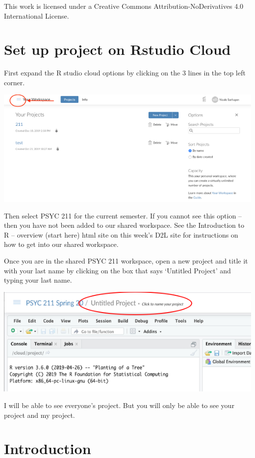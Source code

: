 \documentclass[
]{book}
\begin{document}
This work is licensed under a Creative Commons Attribution-NoDerivatives 4.0 International License.

\hypertarget{set-up-project-on-rstudio-cloud}{%
\chapter{Set up project on Rstudio Cloud}\label{set-up-project-on-rstudio-cloud}}

First expand the R studio cloud options by clicking on the 3 lines in the top left corner.

\includegraphics{img/Picture1.png}

Then select PSYC 211 for the current semester. If you cannot see this option -- then you have not been added to our shared workspace. See the Introduction to R -- overview (start here) html site on this week's D2L site for instructions on how to get into our shared workspace.

Once you are in the shared PSYC 211 workspace, open a new project and title it with your last name by clicking on the box that says `Untitled Project' and typing your last name.

\includegraphics{img/Projname.png}

I will be able to see everyone's project. But you will only be able to see your project and my project.

\hypertarget{introduction}{%
\chapter{Introduction}\label{introduction}}
\end{document}
